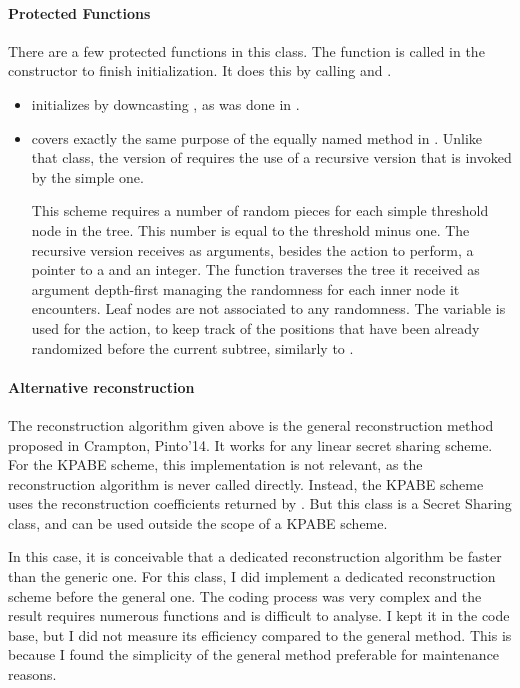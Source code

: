 \documentclass{article}
\begin{document}
\paragraph{Protected Functions}

There are a few protected functions in this class. The function  is called in the constructor to finish initialization. It does this by calling  and . 
\begin{itemize}
\item {} initializes  by downcasting , as was done in \cBLcanon.
\item {} covers exactly the same purpose of the equally named method in \cBLcanon. Unlike that class, the version of \cShTree requires the use of a recursive version that is invoked by the simple one.

This scheme requires a number of random pieces for each simple threshold node in the tree. This number is equal to the threshold minus one. 
The recursive version receives as arguments, besides the action to perform, a pointer to a \ctree and an integer. The function traverses the tree it received as argument depth-first managing the randomness for each inner node it encounters. Leaf nodes are not associated to any randomness. The variable  is used for the  action, to keep track of the positions that have been already randomized before the current subtree, similarly to .

\end{itemize}

\paragraph{Alternative reconstruction}
The reconstruction algorithm given above is the general reconstruction method proposed in Crampton, Pinto'14. It works for any linear secret sharing scheme. For the KPABE scheme, this implementation is not relevant, as the reconstruction algorithm is never called directly. Instead, the KPABE scheme uses the reconstruction coefficients returned by . But this class is a Secret Sharing class, and can be used outside the scope of a KPABE scheme. 

In this case, it is conceivable that a dedicated reconstruction algorithm be faster than the generic one. For this class, I did implement a dedicated reconstruction scheme before the general one. The coding process was very complex and the result requires numerous functions and is difficult to analyse. I kept it in the code base, but I did not measure its efficiency compared to the general method. This is because I found the simplicity of the general method preferable for maintenance reasons. 
\end{document}
